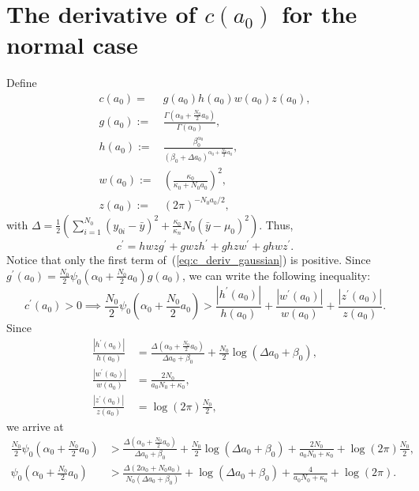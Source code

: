 \documentclass[a4paper, notitlepage, 11pt]{article}
\begin{document}
\section{The derivative of $c(a_0)$ for the normal case}
\label{sec:ca0_norm_deriv}
Define
\begin{align*}
 c(a_0) =& g(a_0)h(a_0)w(a_0)z(a_0), \\
 g(a_0) :=&  \frac{\Gamma\left( \alpha_0 + \frac{N_0}{2}a_0 \right)}{\Gamma(\alpha_0)}, \\
 h(a_0) :=& \frac{\beta_0^{\alpha_0}}{ \left(  \beta_0 + \Delta a_0\right)^{\alpha_0 + \frac{N_0}{2}a_0}}, \\
 w(a_0) :=& \left(\frac{\kappa_0}{\kappa_0 + N_0 a_0} \right)^2 , \\
 z(a_0) :=& (2\pi)^{-N_0 a_0/2}, 
\end{align*}
with $\Delta =  \frac{1}{2}\left( \sum_{i=1}^{N_0}(y_{0i}-\bar{y})^2 + \frac{\kappa_0}{\kappa_n} N_0 (\bar{y}-\mu_0)^2 \right)$.
Thus,
\begin{equation}
\label{eq:c_deriv_gaussian}
 c^\prime = h w z g^\prime + g w z h^\prime + g h z w^\prime + g h w z^\prime.
\end{equation}
Notice that only the first term of~(\ref{eq:c_deriv_gaussian}) is positive.
Since $g^\prime(a_0) = \frac{N_0}{2} \psi_0\left( \alpha_0 +  \frac{N_0}{2} a_0 \right)g(a_0)$, we can write the following inequality:
\begin{equation}
 c^\prime(a_0) > 0 \implies \frac{N_0}{2} \psi_0\left( \alpha_0 +  \frac{N_0}{2} a_0 \right) > \frac{|h^\prime(a_0)|}{h(a_0)} + \frac{|w^\prime(a_0)|}{w(a_0)} + \frac{|z^\prime(a_0)|}{z(a_0)}.
\end{equation}
Since
\begin{align}
 \frac{|h^\prime(a_0)|}{h(a_0)}  &=  \frac{\Delta\left( \alpha_0 + \frac{N_0}{2} a_0 \right) }{\Delta a_0 + \beta_0} + \frac{N_0}{2}\log{\left( \Delta a_0+ \beta_0 \right) }, \\
 \frac{|w^\prime(a_0)|}{w(a_0)}  &= \frac{2N_0}{a_0N_0+\kappa_0},\\
\frac{|z^\prime(a_0)|}{z(a_0)}  &= \log(2\pi) \frac{N_0}{2},
\end{align}
we arrive at
\begin{align}
 \frac{N_0}{2} \psi_0\left( \alpha_0 +  \frac{N_0}{2} a_0 \right) &>  \frac{\Delta\left( \alpha_0 + \frac{N_0}{2} a_0 \right) }{\Delta a_0 + \beta_0} + \frac{N_0}{2}\log{\left( \Delta a_0+ \beta_0 \right) } + \frac{2N_0}{a_0N_0+\kappa_0} + \log(2\pi) \frac{N_0}{2}, \\
\psi_0\left( \alpha_0 +  \frac{N_0}{2} a_0 \right) &>  \frac{\Delta\left( 2\alpha_0 + N_0a_0 \right) }{N_0\left(\Delta a_0 + \beta_0\right)} + \log{\left( \Delta a_0+ \beta_0 \right) } + \frac{4}{a_0N_0+\kappa_0} + \log(2\pi).
\end{align}
\end{document}

